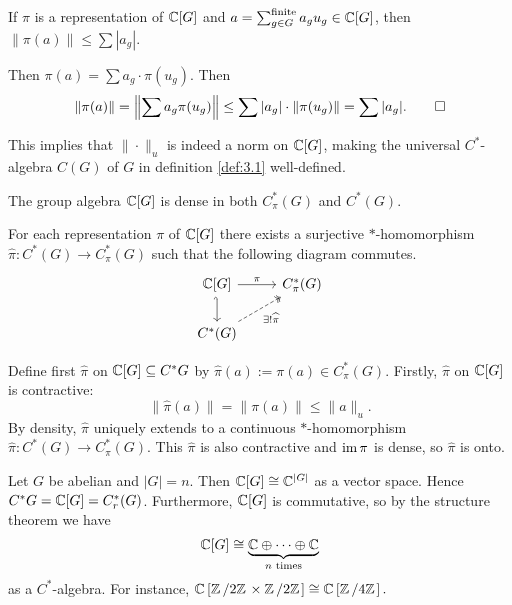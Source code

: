 \begin{lemma}
  If $\pi$ is a representation of $\mathbb {C}[G]$ and $a = \sum_{g \in G} ^{\mathrm{finite}} a_g u_g \in \mathbb {C} [G]$,
  then $\| \pi (a)\| \leq \sum |a_g|$.
\end{lemma}

\begin{myproof}
  Then $\pi(a) = \sum a_g \cdot \pi(u_g)$. Then 
  \begin{equation*}
    \| \pi (a) \| = \left\| \sum a_g \pi (u_g) \right\| \leq \sum |a_g| \cdot \| \pi (u_g)\| = \sum |a_g|. \qedhere
  \end{equation*}
\end{myproof}

This implies that $\| \cdot \|_u$ is indeed a norm on $\mathbb {C} [G]$, making
the universal $C^*$-algebra $C(G)$ of $G$ in definition \ref{def:3.1} well-defined.

\begin{remark}
  The group algebra $\mathbb {C} [G]$ is dense in both $C_{\pi} ^* (G)$ and $C^* (G)$.
\end{remark}

\begin{theorem}
  For each representation $\pi$ of $\mathbb {C} [G]$ there exists a surjective $*$-homomorphism 
  $\widehat{\pi}: C^* (G) \to C_{\pi} ^* (G)$ such that the following diagram commutes.
  \[\begin{tikzcd}
    {\mathbb{C} [G]} & {C_{\pi} ^* (G)} \\
    {C^* (G)}
    \arrow["\pi", from=1-1, to=1-2]
    \arrow[hook', from=1-1, to=2-1]
    \arrow["{\exists !\widehat{\pi}}"', dashed, two heads, from=2-1, to=1-2]
  \end{tikzcd}\]
\end{theorem}

\begin{myproof}
  Define first $\widehat{\pi}$ on $\mathbb {C} [G] \subseteq C^* G$ by $\widehat{\pi} (a) := \pi(a) \in C_{\pi} ^* (G)$.
  Firstly, $\widehat{\pi}$ on $\mathbb {C} [G]$ is contractive:
  $$\|\widehat{\pi} (a)\| = \| \pi(a) \| \leq \| a\|_u.$$
  By density, $\widehat{\pi}$ uniquely extends to a continuous $*$-homomorphism $\widehat{\pi} : C^* (G) \to C_{\pi} ^* (G)$.
  This $\widehat{\pi}$ is also contractive and $\operatorname{im} \pi$ is dense, so $\widehat{\pi}$ is onto.
\end{myproof}

\begin{example}
  Let $G$ be abelian and $|G| = n$. Then $\mathbb {C} [G] \cong \mathbb {C}^{|G|}$ as a vector space.
  Hence $C^* G = \mathbb {C}[G] = C_r ^* (G)$. Furthermore, $\mathbb {C}[G]$ is commutative, so by the structure theorem we have
  $$\mathbb {C} [G] \cong \underbrace{\mathbb {C} \oplus \dots \oplus \mathbb {C}}_{\textrm{$n$ times}}$$
  as a $C^*$-algebra.
  For instance, $\C \left[\quot{\Z}{2\Z} \times \quot{\Z}{2\Z}\right] \cong \C \left[\quot{\Z}{4 \Z}\right].$
\end{example}

